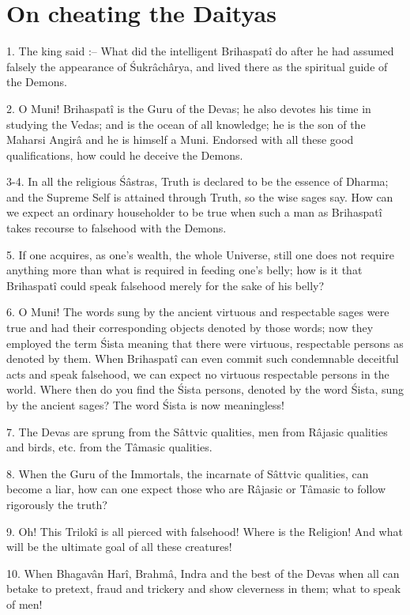 ﻿\chapter{On cheating the Daityas}

1. The king said :-- What did the intelligent Brihaspat\^i do after he had assumed falsely the appearance of \'Sukr\^ach\^arya, and lived there as the spiritual guide of the Demons.

2. O Muni! Brihaspat\^i is the Guru of the Devas; he also devotes his time in studying the Vedas; and is the ocean of all knowledge; he is the son of the Maharsi Angir\^a and he is himself a Muni. Endorsed with all these good qualifications, how could he deceive the Demons.

3-4. In all the religious \'S\^astras, Truth is declared to be the essence of Dharma; and the Supreme Self is attained through Truth, so the wise sages say. How can we expect an ordinary householder to be true when such a man as Brihaspat\^i takes recourse to falsehood with the Demons.

5. If one acquires, as one's wealth, the whole Universe, still one does not require anything more than what is required in feeding one's belly; how is it that Brihaspat\^i could speak falsehood merely for the sake of his belly?

6. O Muni! The words sung by the ancient virtuous and respectable sages were true and had their corresponding objects denoted by those words; now they employed the term \'Sista meaning that there were virtuous, respectable persons as denoted by them. When Brihaspat\^i can even commit such condemnable deceitful acts and speak falsehood, we can expect no virtuous respectable persons in the world. Where then do you find the \'Sista persons, denoted by the word \'Sista, sung by the ancient sages? The word \'Sista is now meaningless!

7. The Devas are sprung from the S\^attvic qualities, men from R\^ajasic qualities and birds, etc. from the T\^amasic qualities.

8. When the Guru of the Immortals, the incarnate of S\^attvic qualities, can become a liar, how can one expect those who are R\^ajasic or T\^amasic to follow rigorously the truth?

9. Oh! This Trilok\^i is all pierced with falsehood! Where is the Religion! And what will be the ultimate goal of all these creatures!

10. When Bhagav\^an Har\^i, Brahm\^a, Indra and the best of the Devas when all can betake to pretext, fraud and trickery and show cleverness in them; what to speak of men!

